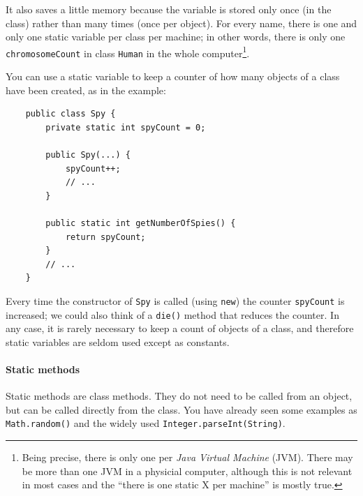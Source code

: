 It also saves a little
memory because 
the variable is stored only once (in the class) rather than many times
(once per object). For every name, there is one and only one static
variable per class per machine; in other words, there is only one
\verb+chromosomeCount+ in class \verb+Human+ in the whole
computer\footnote{Being precise, there is only one per \emph{Java
    Virtual Machine} (JVM). There may be more than one JVM in a
  physicial computer, although this is not relevant in most cases and
  the ``there is one static X per machine'' is mostly true.}. 

% 
% 

You can use a static variable to keep a counter of how many objects of
a class have been created, as in the example: 

\begin{verbatim}
    public class Spy {
        private static int spyCount = 0;

        public Spy(...) {
            spyCount++;
            // ...
        }

        public static int getNumberOfSpies() {
            return spyCount;
        }
        // ...
    }
\end{verbatim}

Every time the constructor of \verb+Spy+ is called (using \verb+new+) 
the counter \verb+spyCount+ is
increased; we could also think of a \verb+die()+ method that reduces
the counter. In any case, it is rarely necessary to keep a count of
objects of a class, and therefore static variables are seldom used
except as constants. 

\paragraph{Static methods}
\label{sec:static-methods}

Static methods are class methods. They do not need to be called from
an object, but can be called directly from the class. You have already
seen some examples as \verb+Math.random()+ 
and the widely used \verb+Integer.parseInt(String)+. 

